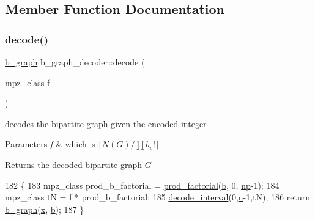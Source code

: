 \subsection{Member Function Documentation}
\mbox{\label{classb__graph__decoder_a81cffad95fa5a051fa4421b164f236a9}} 
\subsubsection{\texorpdfstring{decode()}{decode()}}
{\footnotesize\ttfamily \hyperlink{classb__graph}{b\+\_\+graph} b\+\_\+graph\+\_\+decoder\+::decode (\begin{DoxyParamCaption}\item[{mpz\+\_\+class}]{f }\end{DoxyParamCaption})}



decodes the bipartite graph given the encoded integer 


\begin{DoxyParams}{Parameters}
{\em f} & which is $\lceil N(G) / \prod b_v! \rceil$ \\
\hline
\end{DoxyParams}
\begin{DoxyReturn}{Returns}
the decoded bipartite graph $G$ 
\end{DoxyReturn}

\begin{DoxyCode}
182 \{
183   mpz\_class prod\_b\_factorial = \hyperlink{compression__helper_8cpp_a86d8a20e022dc06b23df3b08ac10b7d1}{prod\_factorial}(\hyperlink{classb__graph__decoder_a12d1a4a91f342111d2116196cb826317}{b}, 0, \hyperlink{classb__graph__decoder_a7eca48cf8793e722d1b29dbdc9fd2dca}{np}-1);
184   mpz\_class tN = f * prod\_b\_factorial;
185   \hyperlink{classb__graph__decoder_ae8b20698e015819cbdb8da7997888fd8}{decode\_interval}(0,\hyperlink{classb__graph__decoder_a2caddd63df6808c95e2ee738f7c77870}{n}-1,tN);
186   \textcolor{keywordflow}{return} \hyperlink{classb__graph}{b\_graph}(\hyperlink{classb__graph__decoder_a6bba2e67984f9733fc60c40dd4956587}{x}, \hyperlink{classb__graph__decoder_a12d1a4a91f342111d2116196cb826317}{b});
187 \}
\end{DoxyCode}
\mbox{\label{classb__graph__decoder_ae8b20698e015819cbdb8da7997888fd8}} 
